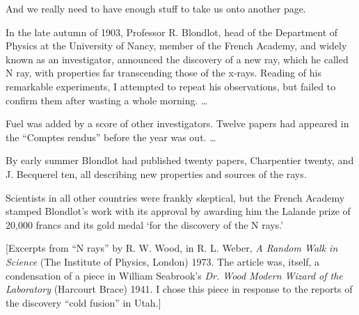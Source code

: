 And we really need to have enough stuff to take us onto another page.

In the late autumn of 1903, Professor
R. Blondlot, head of the
Department of Physics at the University of Nancy, member of the French
Academy, and widely known as an investigator, announced the discovery
of a new ray, which he called N ray, with properties far transcending
those of the x-rays.  Reading of his remarkable experiments, I
attempted to repeat his observations, but failed to confirm them after
wasting a whole morning. \dots

Fuel was added by a score of other investigators. Twelve papers had
appeared in the ``Comptes rendus'' before the year was out. \dots

By early summer Blondlot had published twenty papers,
Charpentier twenty, and J.
Becquerel ten, all describing new properties and
sources of the rays.

Scientists in all other countries were frankly skeptical, but the
French Academy stamped Blondlot's work with its
approval by awarding him the Lalande prize of 20,000 francs and its
gold medal `for the discovery of the N rays.'

[Excerpts from ``N rays'' by R. W. Wood, in R. L.
Weber, \textit{A Random Walk in Science} (The Institute of
Physics, London) 1973.  The article was, itself, a condensation of a
piece in William Seabrook's \textit{Dr. Wood Modern Wizard of the Laboratory}
(Harcourt Brace) 1941.  I chose this piece in response to the reports
of the discovery ``cold fusion'' in Utah.]
\nocite{wood:Nrays}
\nocite{seabrook:wood}




